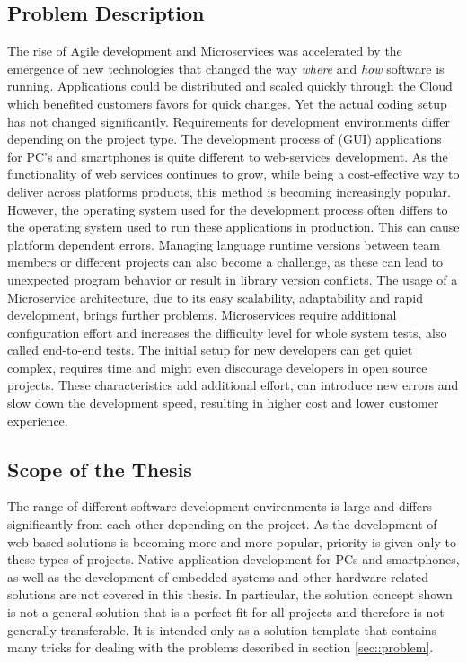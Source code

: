 \documentclass[12pt, a4paper]{article}
\begin{document}
    \subsection{Problem Description}
    The rise of Agile development and Microservices was accelerated by the emergence of new technologies that changed the way \textit{where} and \textit{how} software is running. Applications could be distributed and scaled quickly through the Cloud which benefited customers favors for quick changes. Yet the actual coding setup has not changed significantly.\newline
    Requirements for development environments differ depending on the project type. The development process of (\acs{GUI}) applications for PC's and smartphones is quite different to web-services development. As the functionality of web services continues to grow, while being a cost-effective way to deliver across platforms products, this method is becoming increasingly popular. However, the operating system used for the development process often differs to the operating system used to run these applications in production. This can cause platform dependent errors. Managing language runtime versions between team members or different projects can also become a challenge, as these can lead to unexpected program behavior or result in library version conflicts. The usage of a Microservice architecture, due to its easy scalability, adaptability and rapid development, brings further problems. Microservices require additional configuration effort and increases the difficulty level for whole system tests, also called end-to-end tests. The initial setup for new developers can get quiet complex, requires time and might even discourage developers in open source projects.\newline
    These characteristics add additional effort, can introduce new errors and slow down the development speed, resulting in higher cost and lower customer experience.

    \subsection{Scope of the Thesis}
    The range of different software development environments is large and differs significantly from each other depending on the project. As the development of web-based solutions is becoming more and more popular, priority is given only to these types of projects. Native application development for PCs and smartphones, as well as the development of embedded systems and other hardware-related solutions are not covered in this thesis.\newline
    In particular, the solution concept shown is not a general solution that is a perfect fit for all projects and therefore is not generally transferable. It is intended only as a solution template that contains many tricks for dealing with the problems described in section \ref{sec::problem}.
\end{document}
